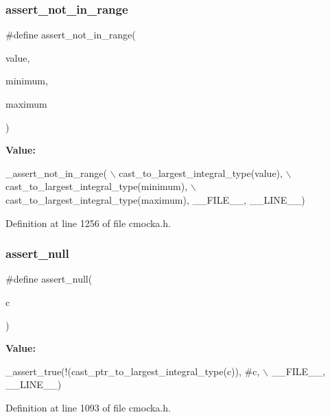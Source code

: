 \subsubsection{\texorpdfstring{assert\+\_\+not\+\_\+in\+\_\+range}{assert\_not\_in\_range}}
{\footnotesize\ttfamily \#define assert\+\_\+not\+\_\+in\+\_\+range(\begin{DoxyParamCaption}\item[{}]{value,  }\item[{}]{minimum,  }\item[{}]{maximum }\end{DoxyParamCaption})}

{\bfseries Value\+:}
\begin{DoxyCode}
\_assert\_not\_in\_range( \(\backslash\)
        cast\_to\_largest\_integral\_type(value), \(\backslash\)
        cast\_to\_largest\_integral\_type(minimum), \(\backslash\)
        cast\_to\_largest\_integral\_type(maximum), \_\_FILE\_\_, \_\_LINE\_\_)
\end{DoxyCode}


Definition at line 1256 of file cmocka.\+h.

\mbox{\label{group__cmocka__asserts_gada8625ecf9ccdbc48398aee7f78245cb}} 
\subsubsection{\texorpdfstring{assert\+\_\+null}{assert\_null}}
{\footnotesize\ttfamily \#define assert\+\_\+null(\begin{DoxyParamCaption}\item[{}]{c }\end{DoxyParamCaption})}

{\bfseries Value\+:}
\begin{DoxyCode}
\_assert\_true(!(cast\_ptr\_to\_largest\_integral\_type(c)), #c, \(\backslash\)
\_\_FILE\_\_, \_\_LINE\_\_)
\end{DoxyCode}


Definition at line 1093 of file cmocka.\+h.

\mbox{\label{group__cmocka__asserts_ga4db2675db965bd10c7adef276bb6aaea}} 
